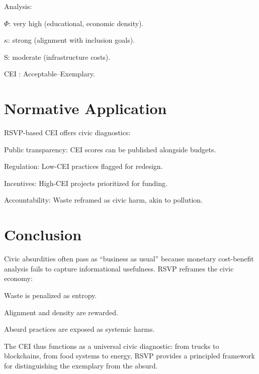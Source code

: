 \documentclass[openany]{book}
\begin{document}
Analysis:

\(\Phi\): very high (educational, economic density).

\(\kappa\): strong (alignment with inclusion goals).

S: moderate (infrastructure costs).

CEI : Acceptable–Exemplary.

\section{Normative Application}

RSVP-based CEI offers civic diagnostics:

Public transparency: CEI scores can be published alongside budgets.

Regulation: Low-CEI practices flagged for redesign.

Incentives: High-CEI projects prioritized for funding.

Accountability: Waste reframed as civic harm, akin to pollution.

\section{Conclusion}

Civic absurdities often pass as “business as usual” because monetary cost-benefit analysis fails to capture informational usefulness. RSVP reframes the civic economy:

Waste is penalized as entropy.

Alignment and density are rewarded.

Absurd practices are exposed as systemic harms.

The CEI thus functions as a universal civic diagnostic: from trucks to blockchains, from food systems to energy, RSVP provides a principled framework for distinguishing the exemplary from the absurd.

\newpage


\end{document}
